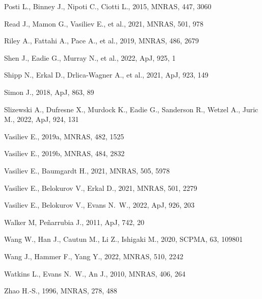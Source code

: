 \documentclass[usenatbib,fleqn]{mnras}
\begin{document}
\begin{thebibliography}{}
Posti L., Binney J., Nipoti C., Ciotti L., 2015, MNRAS, 447, 3060

Read J., Mamon G., Vasiliev E., et al., 2021, MNRAS, 501, 978

Riley A., Fattahi A., Pace A., et al., 2019, MNRAS, 486, 2679

Shen J., Eadie G., Murray N., et al., 2022, ApJ, 925, 1

Shipp N., Erkal D., Drlica-Wagner A., et al., 2021, ApJ, 923, 149

Simon J., 2018, ApJ, 863, 89

Slizewski A., Dufresne X., Murdock K., Eadie G., Sanderson R., Wetzel A., Juric M., 2022, ApJ, 924, 131

Vasiliev E., 2019a, MNRAS, 482, 1525

Vasiliev E., 2019b, MNRAS, 484, 2832

Vasiliev E., Baumgardt H., 2021, MNRAS, 505, 5978

Vasiliev E., Belokurov V., Erkal D., 2021, MNRAS, 501, 2279

Vasiliev E., Belokurov V., Evans N.~W., 2022, ApJ, 926, 203


Walker M, Pe\~narrubia J., 2011, ApJ, 742, 20

Wang W., Han J., Cautun M., Li Z., Ishigaki M., 2020, SCPMA, 63, 109801

Wang J., Hammer F., Yang Y., 2022, MNRAS, 510, 2242


Watkins L., Evans N.~W., An J., 2010, MNRAS, 406, 264

Zhao H.-S., 1996, MNRAS, 278, 488

\end{thebibliography}
\end{document}
